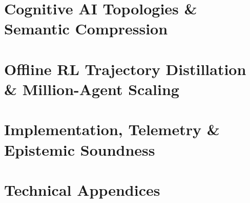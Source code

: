 \documentclass[11pt,a4paper,oneside]{book}
\begin{document}
\part{Cognitive AI Topologies \& Semantic Compression}





\part{Offline RL Trajectory Distillation \& Million-Agent Scaling}





\part{Implementation, Telemetry \& Epistemic Soundness}





\part{Technical Appendices}
\appendix




\backmatter


\end{document}
